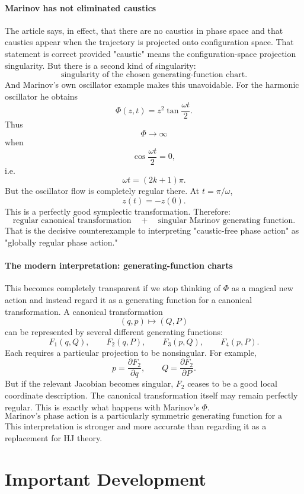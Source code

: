 \paragraph{ Marinov has not eliminated caustics}
The article says, in effect, that there are no caustics in phase space and that
caustics appear when the trajectory is projected onto configuration space.
That statement is correct provided "caustic" means the configuration-space
projection singularity.
But there is a second kind of singularity:
$$ \boxed{\text{singularity of the chosen generating-function chart}.} $$
And Marinov's own oscillator example makes this unavoidable.
For the harmonic oscillator he obtains
$$ \Phi(z,t) = z^2\tan\frac{\omega t}{2}. $$
Thus
$$ \Phi\rightarrow\infty $$
when
$$ \cos\frac{\omega t}{2}=0, $$
i.e.
$$ \omega t=(2k+1)\pi. $$
But the oscillator flow is completely regular there.
At \(t=\pi/\omega\),
$$ z(t)=-z(0). $$
This is a perfectly good symplectic transformation.
Therefore:
$$ \boxed{ \text{regular canonical transformation} \quad+\quad \text{singular Marinov generating function}. } $$
That is the decisive counterexample to interpreting "caustic-free phase action" as "globally regular phase action."

\paragraph{ The modern interpretation: generating-function charts}
This becomes completely transparent if we stop thinking of \(\Phi\) as a
magical new action and instead regard it as a generating function for a
canonical transformation.
A canonical transformation
$$ (q,p)\mapsto(Q,P) $$
can be represented by several different generating functions:
$$ F_1(q,Q),\qquad F_2(q,P),\qquad F_3(p,Q),\qquad F_4(p,P). $$
Each requires a particular projection to be nonsingular.
For example,
$$ p=\frac{\partial F_2}{\partial q}, \qquad Q=\frac{\partial F_2}{\partial P}. $$
But if the relevant Jacobian becomes singular, \(F_2\) ceases to be a good
local coordinate description.
The canonical transformation itself may remain perfectly regular.
This is exactly what happens with Marinov's \(\Phi\).
$$ \boxed{ \text{Marinov's phase action is a particularly symmetric generating
function for a finite canonical transformation.} } $$
This interpretation is stronger and more accurate than regarding it as a replacement for HJ theory.

\section{ Important Development}

